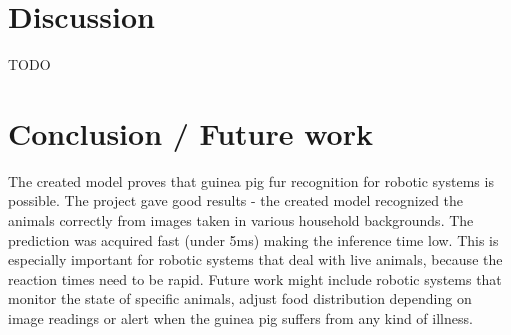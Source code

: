 \documentclass[10pt,journal,compsoc]{IEEEtran}
\begin{document}
    \section{Discussion}
    TODO
    
    \section{Conclusion / Future work}
    The created model proves that guinea pig fur recognition for robotic systems is possible. The project gave good results - the created model recognized the animals correctly from images taken in various household backgrounds. The prediction was acquired fast (under 5ms) making the inference time low. This is especially important for robotic systems that deal with live animals, because the reaction times need to be rapid. \newline\newline
    Future work might include robotic systems that monitor the state of specific animals, adjust food distribution depending on image readings or alert when the guinea pig suffers from any kind of illness.
    
   
   
    
    
\end{document}
